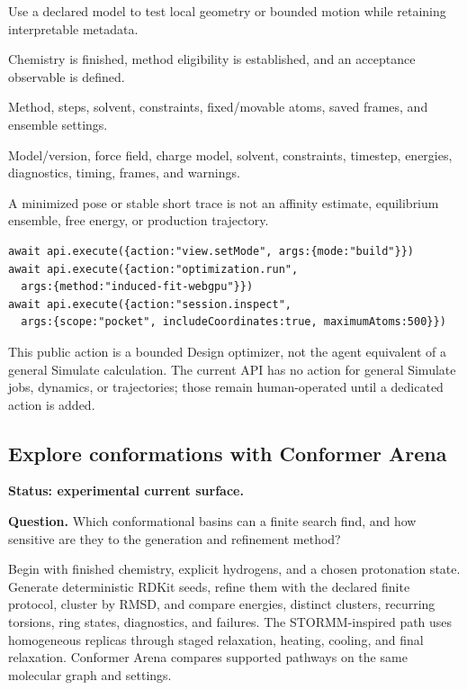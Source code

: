 \begin{small}
\begin{description}[leftmargin=2.2cm,style=nextline]
\item[Goal] Use a declared model to test local geometry or bounded motion while retaining interpretable metadata.
\item[Preconditions] Chemistry is finished, method eligibility is established, and an acceptance observable is defined.
\item[Inputs] Method, steps, solvent, constraints, fixed/movable atoms, saved frames, and ensemble settings.
\item[Evidence] Model/version, force field, charge model, solvent, constraints, timestep, energies, diagnostics, timing, frames, and warnings.
\item[Stop] A minimized pose or stable short trace is not an affinity estimate, equilibrium ensemble, free energy, or production trajectory.
\end{description}

\begin{lstlisting}
await api.execute({action:"view.setMode", args:{mode:"build"}})
await api.execute({action:"optimization.run",
  args:{method:"induced-fit-webgpu"}})
await api.execute({action:"session.inspect",
  args:{scope:"pocket", includeCoordinates:true, maximumAtoms:500}})
\end{lstlisting}

This public action is a bounded Design optimizer, not the agent equivalent of a general Simulate calculation. The current API has no action for general Simulate jobs, dynamics, or trajectories; those remain human-operated until a dedicated action is added.

\subsection{Explore conformations with Conformer Arena}\label{appB:conformers}

\textbf{Status: experimental current surface.}

\textbf{Question.} Which conformational basins can a finite search find, and how sensitive are they to the generation and refinement method?

Begin with finished chemistry, explicit hydrogens, and a chosen protonation state. Generate deterministic RDKit seeds, refine them with the declared finite protocol, cluster by RMSD, and compare energies, distinct clusters, recurring torsions, ring states, diagnostics, and failures. The STORMM-inspired path uses homogeneous replicas through staged relaxation, heating, cooling, and final relaxation. Conformer Arena compares supported pathways on the same molecular graph and settings.


\end{small}
